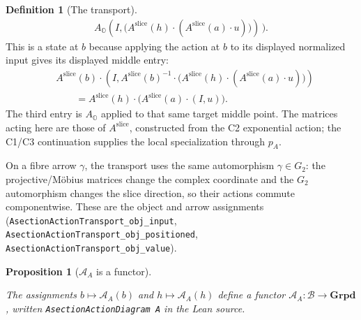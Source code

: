 \documentclass[11pt]{article}
\newcommand{\OO}{\mathbb{O}}
\providecommand{\lean}[1]{}
\providecommand{\notready}{}
\providecommand{\uses}[1]{}
\theoremstyle{plain}
\newtheorem{proposition}[theorem]{Proposition}
\theoremstyle{definition}
\newtheorem{definition}[theorem]{Definition}
\theoremstyle{remark}
\begin{document}
\begin{definition}[The transport]
\[\begin{aligned}
    A_{\OO}\!\left(I,
      \bigl(A^{\mathrm{slice}}(h)\mathbin{\cdot}
      (A^{\mathrm{slice}}(a)\mathbin{\cdot}u)\bigr)\right)\,\Bigr).
\end{aligned}
\]
This is a state at $b$ because applying the action at $b$ to its displayed
normalized input gives its displayed middle entry:
\[
\begin{aligned}
 &A^{\mathrm{slice}}(b)\mathbin{\cdot}
 \left(I,
 A^{\mathrm{slice}}(b)^{-1}\mathbin{\cdot}
 \bigl(A^{\mathrm{slice}}(h)\mathbin{\cdot}
 (A^{\mathrm{slice}}(a)\mathbin{\cdot}u)\bigr)\right)\\
 &\qquad=
 A^{\mathrm{slice}}(h)\mathbin{\cdot}
 \bigl(A^{\mathrm{slice}}(a)\mathbin{\cdot}(I,u)\bigr).
\end{aligned}
\]
The third entry is $A_{\OO}$ applied to that same target middle point.
The matrices acting here are those of $A^{\mathrm{slice}}$, constructed
from the C2 exponential action; the C1/C3 continuation supplies the local
specialization through $p_A$.

On a fibre
arrow $\gamma$, the transport uses the same automorphism
$\gamma\in G_2$: the projective/M\"obius matrices change the complex
coordinate and the $G_2$ automorphism changes the slice direction, so their
actions commute componentwise.  These are the object and arrow assignments
\textup{(}\texttt{AsectionActionTransport\_\allowbreak obj\_\allowbreak input},
\texttt{AsectionActionTransport\_\allowbreak obj\_\allowbreak positioned},
\texttt{AsectionActionTransport\_\allowbreak obj\_\allowbreak value}\textup{)}.
\end{definition}

\begin{proposition}[$\mathcal A_A$ is a functor]\label{prop:AA-functor}
\lean{ASection.AsectionActionDiagram,
ASection.AsectionActionTransport_id,
ASection.AsectionActionTransport_comp}
\notready
\uses{def:states, def:transport, prop:aslice-functor}
The assignments $b\mapsto\mathcal A_A(b)$ and $h\mapsto\mathcal A_A(h)$
define a functor $\mathcal A_A:\mathcal B\to\mathbf{Grpd}$, written
\texttt{AsectionActionDiagram\,A} in the Lean source.
\end{proposition}
\end{document}
